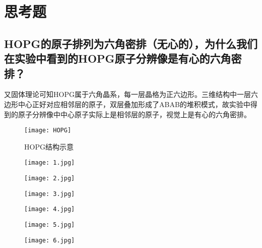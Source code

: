 \documentclass[aps,pre,12pt,preprint,onecolumn,showpacs,showkeys]{revtex4-1}
\begin{document}
\clearpage
\appendix
\section{思考题}
\subsection{HOPG的原子排列为六角密排（无心的），为什么我们在实验中看到的HOPG原子分辨像是有心的六角密排？}
又固体理论可知HOPG属于六角晶系，每一层晶格为正六边形。三维结构中一层六边形中心正好对应相邻层的原子，双层叠加形成了ABAB的堆积模式，故实验中得到的原子分辨像中中心原子实际上是相邻层的原子，视觉上是有心的六角密排。
\begin{figure}[H]
\centering
\texttt{[image: HOPG]}
\centering
\caption{\label{fig:图10}%
HOPG结构示意}
\end{figure}

\begin{figure}[H]
\centering
\texttt{[image: 1.jpg]}
\centering
\end{figure}

\begin{figure}[H]
\centering
\texttt{[image: 2.jpg]}
\centering
\end{figure}

\begin{figure}[H]
\centering
\texttt{[image: 3.jpg]}
\centering
\end{figure}

\begin{figure}[H]
\centering
\texttt{[image: 4.jpg]}
\centering
\end{figure}

\begin{figure}[H]
\centering
\texttt{[image: 5.jpg]}
\centering
\end{figure}

\begin{figure}[H]
\centering
\texttt{[image: 6.jpg]}
\centering
\end{figure}
\end{document}
